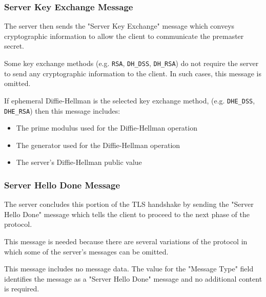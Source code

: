 \documentclass[aspectratio=169]{beamer}
\begin{document}
\begin{frame}
	\frametitle{Server Key Exchange Message}	
	The server then sends the "Server Key Exchange" message which conveys cryptographic information to allow the client to communicate the premaster secret.
	
	\vfill
	
		Some key exchange methods (e.g. \texttt{RSA},  \texttt{DH\_DSS}, \texttt{DH\_RSA}) do not require the server to send any cryptographic information to the client.  In such cases, this message is omitted.

	\vfill
	
	If ephemeral Diffie-Hellman is the selected key exchange method, (e.g. \texttt{DHE\_DSS}, \texttt{DHE\_RSA})  then this message includes:
	\begin{itemize}
		\item The prime modulus used for the Diffie-Hellman operation
		\item The generator used for the Diffie-Hellman operation
		\item The server's Diffie-Hellman public value
	\end{itemize}
	
\end{frame}

\begin{frame}
	\frametitle{Server Hello Done Message}
	The server concludes this portion of the TLS handshake by sending the "Server Hello Done" message which tells the client to proceed to the next phase of the protocol.
	
	\vfill
	
	This message is needed because there are several variations of the protocol in which some of the server's messages can be omitted.
	
	\vfill
	
	This message includes no message data. The value for the "Message Type" field identifies the message as a "Server Hello Done" message and no additional content is required.
\end{frame}
\end{document}
